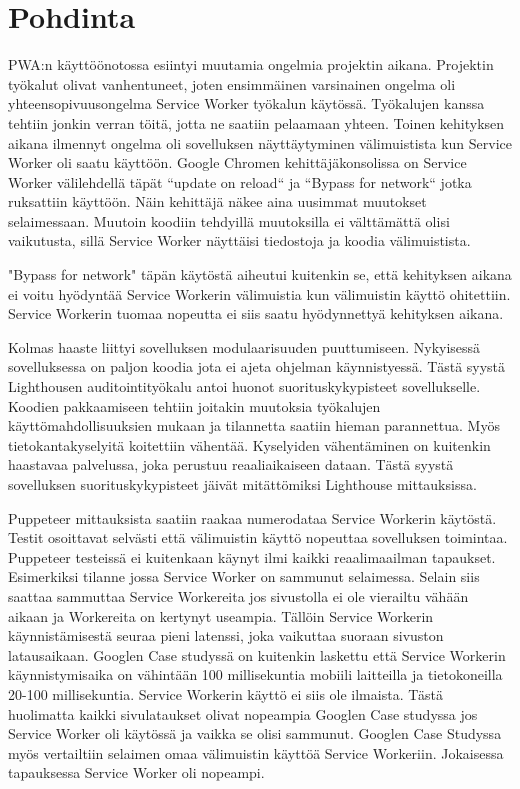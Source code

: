 \documentclass{tktltiki}
\begin{document}
\clearpage
\section{Pohdinta}

PWA:n käyttöönotossa esiintyi muutamia ongelmia projektin aikana. Projektin työkalut olivat vanhentuneet, joten ensimmäinen varsinainen ongelma oli yhteensopivuusongelma Service Worker työkalun käytössä. Työkalujen kanssa tehtiin jonkin verran töitä, jotta ne saatiin pelaamaan yhteen. Toinen kehityksen aikana ilmennyt ongelma oli sovelluksen näyttäytyminen välimuistista kun Service Worker oli saatu käyttöön. Google Chromen kehittäjäkonsolissa on Service Worker välilehdellä täpät “update on reload“ ja “Bypass for network“ jotka ruksattiin käyttöön. Näin kehittäjä näkee aina uusimmat muutokset selaimessaan. Muutoin koodiin tehdyillä muutoksilla ei välttämättä olisi vaikutusta, sillä Service Worker näyttäisi tiedostoja ja koodia välimuistista. 

"Bypass for network" täpän käytöstä aiheutui kuitenkin se, että kehityksen aikana ei voitu hyödyntää Service Workerin välimuistia kun välimuistin käyttö ohitettiin. Service Workerin tuomaa nopeutta ei siis saatu hyödynnettyä kehityksen aikana.

Kolmas haaste liittyi sovelluksen modulaarisuuden puuttumiseen. Nykyisessä sovelluksessa on paljon koodia jota ei ajeta ohjelman käynnistyessä. Tästä syystä Lighthousen auditointityökalu antoi huonot suorituskykypisteet sovellukselle. Koodien pakkaamiseen tehtiin joitakin muutoksia työkalujen käyttömahdollisuuksien mukaan ja tilannetta saatiin hieman parannettua. Myös tietokantakyselyitä koitettiin vähentää. Kyselyiden vähentäminen on kuitenkin haastavaa palvelussa, joka perustuu reaaliaikaiseen dataan. Tästä syystä sovelluksen suorituskykypisteet jäivät mitättömiksi Lighthouse mittauksissa. 

Puppeteer mittauksista saatiin raakaa numerodataa Service Workerin käytöstä. Testit osoittavat selvästi että välimuistin käyttö nopeuttaa sovelluksen toimintaa. Puppeteer testeissä ei kuitenkaan käynyt ilmi kaikki reaalimaailman tapaukset. Esimerkiksi tilanne jossa Service Worker on sammunut selaimessa. Selain siis saattaa sammuttaa Service Workereita jos sivustolla ei ole vierailtu vähään aikaan ja Workereita on kertynyt useampia. Tällöin Service Workerin käynnistämisestä seuraa pieni latenssi, joka vaikuttaa suoraan sivuston latausaikaan. Googlen Case studyssä on kuitenkin laskettu että Service Workerin käynnistymisaika on vähintään 100 millisekuntia mobiili laitteilla ja tietokoneilla 20-100 millisekuntia. Service Workerin käyttö ei siis ole ilmaista. Tästä huolimatta kaikki sivulataukset olivat nopeampia Googlen Case studyssa jos Service Worker oli käytössä ja vaikka se olisi sammunut. Googlen Case Studyssa myös vertailtiin selaimen omaa välimuistin käyttöä Service Workeriin. Jokaisessa tapauksessa Service Worker oli nopeampi. 
\end{document}
